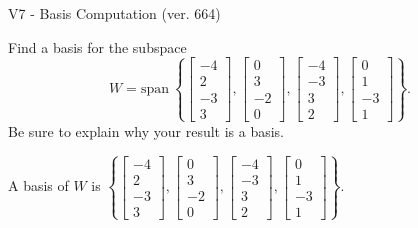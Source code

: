 \begin{exercise}
  \begin{exerciseTitle}V7 - Basis Computation (ver. 664)\end{exerciseTitle}
  \begin{exerciseStatement}
    Find a basis for the subspace 
\[W=\mathrm{span}\ \left\{\left[\begin{array}{r}
-4 \\
2 \\
-3 \\
3
\end{array}\right] , \left[\begin{array}{r}
0 \\
3 \\
-2 \\
0
\end{array}\right] , \left[\begin{array}{r}
-4 \\
-3 \\
3 \\
2
\end{array}\right] , \left[\begin{array}{r}
0 \\
1 \\
-3 \\
1
\end{array}\right]\right\}.\]
 Be sure to explain why your result is a basis.


  \end{exerciseStatement}
  \begin{exerciseAnswer}
   A basis of \(W\) is  \(\left\{\left[\begin{array}{r}
-4 \\
2 \\
-3 \\
3
\end{array}\right] , \left[\begin{array}{r}
0 \\
3 \\
-2 \\
0
\end{array}\right] , \left[\begin{array}{r}
-4 \\
-3 \\
3 \\
2
\end{array}\right] , \left[\begin{array}{r}
0 \\
1 \\
-3 \\
1
\end{array}\right]\right\}\).
  


  \end{exerciseAnswer}
\end{exercise}